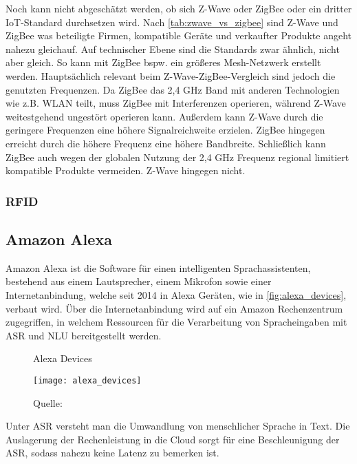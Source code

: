 Noch kann nicht abgeschätzt werden, ob sich Z-Wave oder ZigBee oder ein dritter \ac{IoT}-Standard durchsetzen wird.
Nach \autoref{tab:zwave_vs_zigbee} sind Z-Wave und ZigBee was beteiligte Firmen, kompatible Geräte und verkaufter Produkte angeht nahezu gleichauf.
Auf technischer Ebene sind die Standards zwar ähnlich, nicht aber gleich.
So kann mit ZigBee bspw. ein größeres Mesh-Netzwerk erstellt werden.
Hauptsächlich relevant beim Z-Wave-ZigBee-Vergleich sind jedoch die genutzten Frequenzen.
Da ZigBee das 2,4 GHz Band mit anderen Technologien wie z.B. \ac{WLAN} teilt, muss ZigBee mit Interferenzen operieren, während Z-Wave weitestgehend ungestört operieren kann.
Außerdem kann Z-Wave durch die geringere Frequenzen eine höhere Signalreichweite erzielen.
ZigBee hingegen erreicht durch die höhere Frequenz eine höhere Bandbreite.
Schließlich kann ZigBee auch wegen der globalen Nutzung der 2,4 GHz Frequenz regional limitiert kompatible Produkte vermeiden.
Z-Wave hingegen nicht.

\subsubsection{RFID}


\subsection{Amazon Alexa}

Amazon Alexa ist die Software für einen intelligenten Sprachassistenten, bestehend aus einem Lautsprecher, einem Mikrofon sowie einer Internetanbindung, welche seit 2014 in Alexa Geräten, wie in \autoref{fig:alexa_devices}, verbaut wird.
Über die Internetanbindung wird auf ein Amazon Rechenzentrum zugegriffen, in welchem Ressourcen für die Verarbeitung von Spracheingaben mit \ac{ASR} und \ac{NLU} bereitgestellt werden.

\begin{figure}[ht]
	\centering
	\caption{Alexa Devices}
	\texttt{[image: alexa\_devices]}
	\caption*{\footnotesize{Quelle: }}
	\label{fig:alexa_devices}
\end{figure}

Unter \ac{ASR} versteht man die Umwandlung von menschlicher Sprache in Text.
Die Auslagerung der Rechenleistung in die Cloud sorgt für eine Beschleunigung der \ac{ASR}, sodass nahezu keine Latenz zu bemerken ist.

